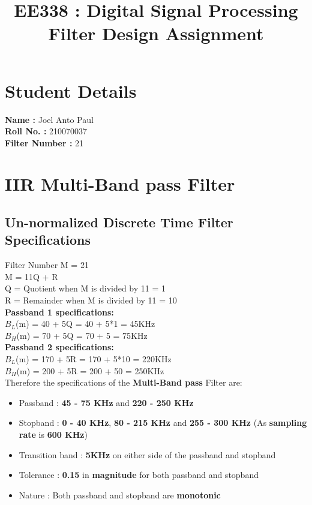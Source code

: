\documentclass{article}
\title{EE338 : Digital Signal Processing \\ Filter Design Assignment}
\date{}
\begin{document}
\maketitle

\section{\textbf{Student Details}}
\textbf{Name : }Joel Anto Paul\\
\textbf{Roll No. : }210070037\\
\textbf{Filter Number : }21

\section{\textbf{IIR Multi-Band pass Filter}}
\subsection{\textbf{Un-normalized Discrete Time Filter Specifications}}
Filter Number M = 21\\
M = 11Q + R\\
Q = Quotient when M is divided by 11 = 1\\
R = Remainder when M is divided by 11 = 10\\
\textbf{Passband 1 specifications:} \\
$B_L$(m) = 40 + 5Q = 40 + 5*1 = 45KHz \\
$B_H$(m) = 70 + 5Q = 70 + 5 = 75KHz\\
\textbf{Passband 2 specifications:}\\
$B_L$(m) = 170 + 5R = 170 + 5*10 = 220KHz \\
$B_H$(m) = 200 + 5R = 200 + 50 = 250KHz\\
\noindent
Therefore the specifications of the \textbf{Multi-Band pass} Filter are:
\begin{itemize}
    \item Passband : \textbf{45 - 75 KHz} and \textbf{220 - 250 KHz} 
    \item Stopband : \textbf{0 - 40 KHz}, \textbf{80 - 215 KHz} and \textbf{255 - 300 KHz} (As \textbf{sampling rate} is \textbf{600 KHz})
    \item  Transition band : \textbf{5KHz} on either side of the passband and stopband
    \item  Tolerance : \textbf{0.15} in \textbf{magnitude} for both passband and stopband
    \item  Nature : Both passband and stopband are \textbf{monotonic}
\end{itemize}
\end{document}
